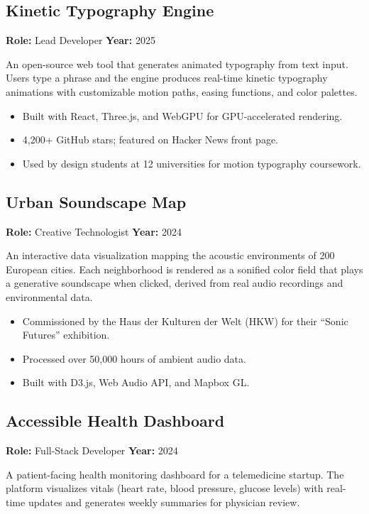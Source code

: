 \documentclass[
    language=english,
    doctype=personal-portfolio,
    institution=none,
]{../../omnilatex}
\begin{document}
\subsection{Kinetic Typography Engine}

\textbf{Role:} Lead Developer \hfill \textbf{Year:} 2025

An open-source web tool that generates animated typography from text input. Users type a phrase and the engine produces real-time kinetic typography animations with customizable motion paths, easing functions, and color palettes.

\begin{itemize}
    \item Built with React, Three.js, and WebGPU for GPU-accelerated rendering.
    \item 4,200+ GitHub stars; featured on Hacker News front page.
    \item Used by design students at 12 universities for motion typography coursework.
\end{itemize}

\subsection{Urban Soundscape Map}

\textbf{Role:} Creative Technologist \hfill \textbf{Year:} 2024

An interactive data visualization mapping the acoustic environments of 200 European cities. Each neighborhood is rendered as a sonified color field that plays a generative soundscape when clicked, derived from real audio recordings and environmental data.

\begin{itemize}
    \item Commissioned by the Haus der Kulturen der Welt (HKW) for their ``Sonic Futures'' exhibition.
    \item Processed over 50,000 hours of ambient audio data.
    \item Built with D3.js, Web Audio API, and Mapbox GL.
\end{itemize}

\subsection{Accessible Health Dashboard}

\textbf{Role:} Full-Stack Developer \hfill \textbf{Year:} 2024

A patient-facing health monitoring dashboard for a telemedicine startup. The platform visualizes vitals (heart rate, blood pressure, glucose levels) with real-time updates and generates weekly summaries for physician review.
\end{document}
